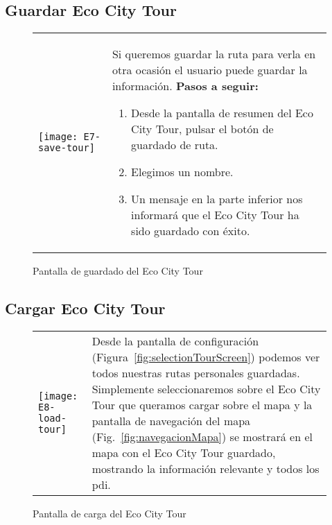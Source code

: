 \subsection{Guardar Eco City Tour}
\begin{figure}[H]
	\centering
	\begin{tabular}{m{} m{}}
		\texttt{[image: E7-save-tour]} & 
		\vspace{-10pt}
		Si queremos guardar la ruta para verla en otra ocasión el usuario puede guardar la información.
		\textbf{Pasos a seguir:}
		\begin{enumerate}
			\item Desde la pantalla de resumen del Eco City Tour, pulsar el botón de guardado de ruta.
			\item Elegimos un nombre.
			\item Un mensaje en la parte inferior nos informará que el Eco City Tour ha sido guardado con éxito.
		\end{enumerate}		
	\end{tabular}
	\caption{Pantalla de guardado del Eco City Tour}
	\label{fig:saveECT}
\end{figure}

\subsection{Cargar Eco City Tour}
\begin{figure}[H]
	\centering
	\begin{tabular}{m{} m{}}
		\texttt{[image: E8-load-tour]} & 
		\vspace{-10pt}
		Desde la pantalla de configuración (Figura~\ref{fig:selectionTourScreen}) podemos ver todos nuestras rutas personales guardadas.
		Simplemente seleccionaremos sobre el Eco City Tour que queramos cargar sobre el mapa y la pantalla de navegación del mapa  (Fig.~\ref{fig:navegacionMapa}) se mostrará en el mapa con el Eco City Tour guardado, mostrando la información relevante y todos los \acrlong{pdi}.	
	\end{tabular}
	\caption{Pantalla de carga del Eco City Tour}
	\label{fig:loadECT}
\end{figure}

